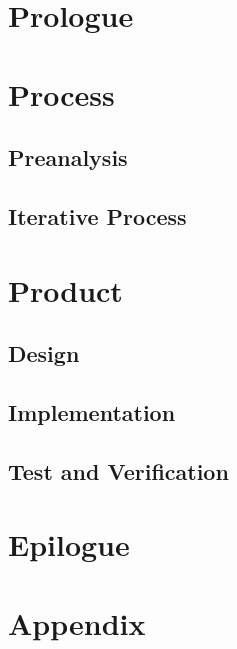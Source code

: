 

\part{Prologue}



\cleardoublepage


\part{Process}
\chapter{Preanalysis}

\chapter{Iterative Process} %



\part{Product}


\chapter{Design}

\chapter{Implementation}

\chapter{Test and Verification}




\part{Epilogue}


\part{Appendix} %

\appendix

